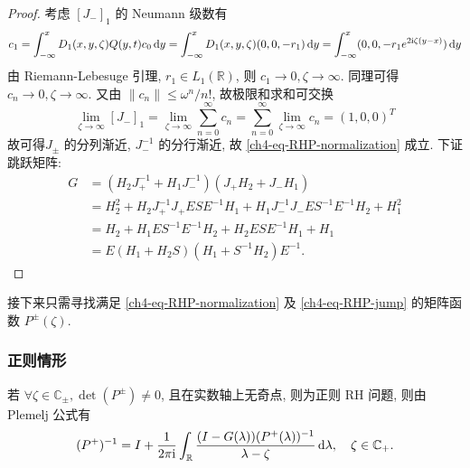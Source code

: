 \begin{proof}
    考虑 $[J_{-}]_{1}$ 的 Neumann 级数有
    \begin{equation}
        c_{1} = \int_{-\infty}^{x} D_{1}(x,y,\zeta) Q(y,t) c_{0} \mathop{}\!\mathrm{d} y = \int_{-\infty}^{x} D_{1}(x,y,\zeta) (0,0,-r_{1}) \mathop{}\!\mathrm{d} y = \int_{-\infty}^{x} (0,0,-r_{1} e^{2 \mathrm{i} \zeta (y-x)}) \mathop{}\!\mathrm{d} y
    \end{equation}
    由 Riemann-Lebesuge 引理, $r_{1} \in L_{1}(\mathbb{R})$, 则 $c_{1} \to 0, \zeta \to \infty$. 同理可得 $c_{n} \to 0, \zeta \to \infty$. 又由 $\|c_{n} \| \leq \omega^{n}/n!$, 故极限和求和可交换
    \begin{equation}
        \lim_{\zeta \to \infty}[J_{-}]_{1} = \lim_{\zeta \to \infty} \sum_{n=0}^{\infty} c_{n} = \sum_{n=0}^{\infty} \lim_{\zeta \to \infty} c_{n} = (1,0,0)^{T}
    \end{equation}
    故可得$J_{\pm}$ 的分列渐近, $J_{-}^{-1}$ 的分行渐近, 故 \eqref{ch4-eq-RHP-normalization} 成立. 下证跳跃矩阵:
    \begin{equation}
        \begin{aligned}
            G & = (H_{2} J_{+}^{-1} + H_{1} J_{-}^{-1})(J_{+}H_{2} + J_{-} H_{1})                                                \\
              & = H_{2}^{2} + H_{2} J_{+}^{-1} J_{+} E S E^{-1} H_{1} + H_{1} J_{-}^{-1} J_{-} E S^{-1} E^{-1} H_{2} + H_{1}^{2} \\
              & = H_{2} + H_{1} E S^{-1} E^{-1} H_{2} + H_{2} E S E^{-1} H_{1} + H_{1}                                           \\
              & = E(H_{1} + H_{2} S)(H_{1} + S^{-1} H_{2}) E^{-1}.
        \end{aligned}
    \end{equation}
\end{proof}
接下来只需寻找满足 \eqref{ch4-eq-RHP-normalization} 及 \eqref{ch4-eq-RHP-jump} 的矩阵函数 $ P^{\pm}(\zeta) $.
\subsubsection{正则情形}
若 $\forall \zeta \in \mathbb{C}_{\pm}, \det(P^{\pm}) \neq 0$, 且在实数轴上无奇点, 则为正则 RH 问题, 则由 Plemelj 公式有
\begin{equation}
    (P^{+})^{-1} = I + \frac{1}{2 \pi \mathrm{i}} \int_{\mathbb{R}} \frac{(I - G(\lambda)) (P^{+}(\lambda))^{-1}}{\lambda - \zeta} \mathop{}\!\mathrm{d} \lambda, \quad \zeta \in \mathbb{C}_{+}.
\end{equation}
